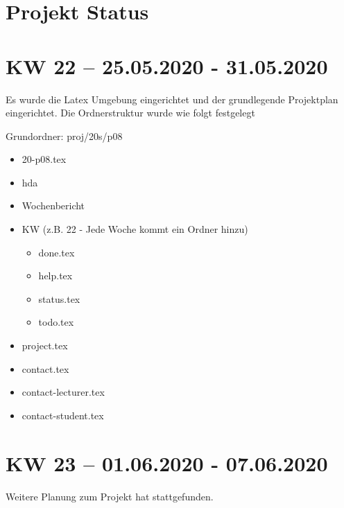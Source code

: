 \documentclass{hda/hdaConceptClass}
\begin{document}
\makesitHead



\chapter{Projekt Status
}\label{chap:status}



\newpage %


\chapter{KW 22 -- 25.05.2020 - 31.05.2020
}\label{chap:kwxn}
Es wurde die Latex Umgebung eingerichtet und der grundlegende Projektplan eingerichtet.
Die Ordnerstruktur wurde wie folgt festgelegt

Grundordner: proj/20s/p08 \newline

\begin{itemize}
  \item 20-p08.tex
  \item hda
  \item Wochenbericht
  \item KW (z.B. 22 - Jede Woche kommt ein Ordner hinzu)
  \begin{itemize}
    \item done.tex
    \item help.tex
    \item status.tex
    \item todo.tex
  \end{itemize}
  \item project.tex
  \item contact.tex
  \item contact-lecturer.tex
  \item contact-student.tex
\end{itemize}



\newpage %


\chapter{KW 23 -- 01.06.2020 - 07.06.2020
}\label{chap:kwxn}
Weitere Planung zum Projekt hat stattgefunden.
\end{document}
